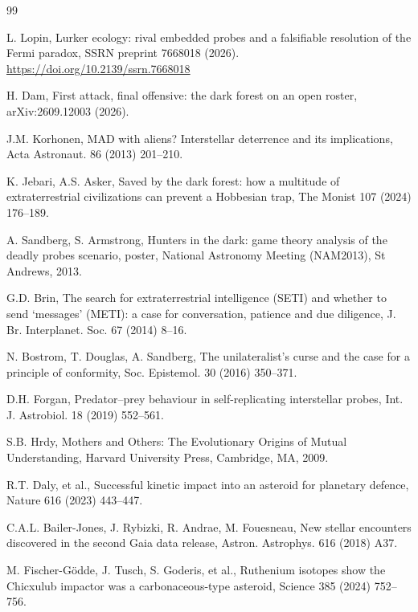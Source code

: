\documentclass[preprint,12pt]{elsarticle}
\theoremstyle{definition}
\begin{document}
\begin{thebibliography}{99}

 L. Lopin, Lurker ecology: rival embedded probes and a falsifiable resolution of the Fermi paradox, SSRN preprint 7668018 (2026). \url{https://doi.org/10.2139/ssrn.7668018}

 H. Dam, First attack, final offensive: the dark forest on an open roster, arXiv:2609.12003 (2026).

 J.M. Korhonen, MAD with aliens? Interstellar deterrence and its implications, Acta Astronaut. 86 (2013) 201--210.

 K. Jebari, A.S. Asker, Saved by the dark forest: how a multitude of extraterrestrial civilizations can prevent a Hobbesian trap, The Monist 107 (2024) 176--189.

 A. Sandberg, S. Armstrong, Hunters in the dark: game theory analysis of the deadly probes scenario, poster, National Astronomy Meeting (NAM2013), St Andrews, 2013.

 G.D. Brin, The search for extraterrestrial intelligence (SETI) and whether to send `messages' (METI): a case for conversation, patience and due diligence, J. Br. Interplanet. Soc. 67 (2014) 8--16.

 N. Bostrom, T. Douglas, A. Sandberg, The unilateralist's curse and the case for a principle of conformity, Soc. Epistemol. 30 (2016) 350--371.

 D.H. Forgan, Predator--prey behaviour in self-replicating interstellar probes, Int. J. Astrobiol. 18 (2019) 552--561.

 S.B. Hrdy, Mothers and Others: The Evolutionary Origins of Mutual Understanding, Harvard University Press, Cambridge, MA, 2009.

 R.T. Daly, et al., Successful kinetic impact into an asteroid for planetary defence, Nature 616 (2023) 443--447.

 C.A.L. Bailer-Jones, J. Rybizki, R. Andrae, M. Fouesneau, New stellar encounters discovered in the second Gaia data release, Astron. Astrophys. 616 (2018) A37.

 M. Fischer-G\"odde, J. Tusch, S. Goderis, et al., Ruthenium isotopes show the Chicxulub impactor was a carbonaceous-type asteroid, Science 385 (2024) 752--756.


\end{thebibliography}
\end{document}
